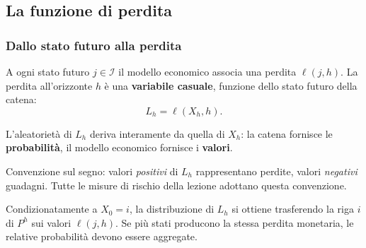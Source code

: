 
\subsection{La funzione di perdita}%

\begin{frame}%
%

\frametitle{Dallo stato futuro alla perdita}%
%

%


A ogni stato futuro $j\in\mathcal{I}$ il modello economico associa una perdita
$\ell(j,h)$. La perdita all'orizzonte $h$ \`e una \textbf{variabile casuale},
funzione dello stato futuro della catena:
\[
L_{h} = \ell(X_{h},h).
\]

\medskip

\begin{stepitemize}
\item L'aleatoriet\`a di $L_{h}$ deriva interamente da quella di $X_{h}$: la
catena fornisce le \textbf{probabilit\`a}, il modello economico fornisce i
\textbf{valori}.

\item Convenzione sul segno: valori \emph{positivi} di $L_{h}$ rappresentano
perdite, valori \emph{negativi} guadagni. Tutte le misure di rischio della
lezione adottano questa convenzione.

\item Condizionatamente a $X_{0}=i$, la distribuzione di $L_{h}$ si ottiene
trasferendo la riga $i$ di $P^{h}$ sui valori $\ell(j,h)$. Se pi\`u stati
producono la stessa perdita monetaria, le relative probabilit\`a devono
essere aggregate.
\end{stepitemize}

\transboxout
\end{frame}%



